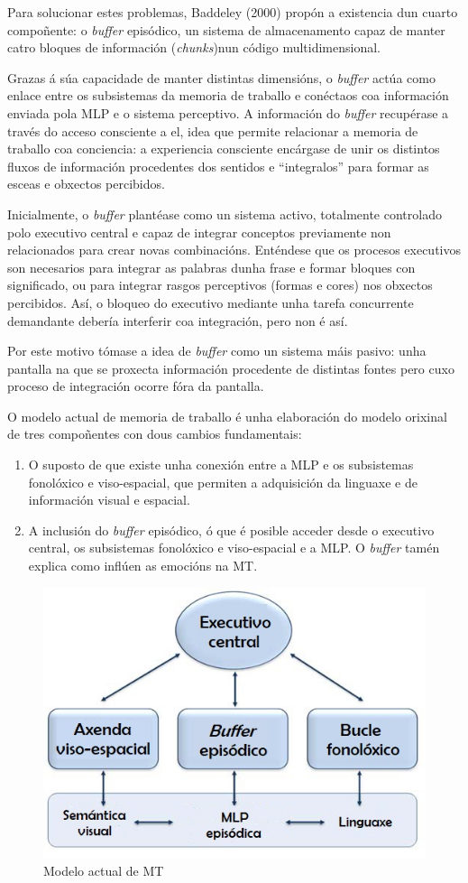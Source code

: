 \documentclass[a4paper,11pt]{article}
\begin{document}
Para solucionar estes problemas, Baddeley (2000) propón a existencia dun cuarto compoñente: o \textit{buffer} episódico, un sistema de almacenamento capaz de manter catro bloques de información (\textit{chunks})nun código multidimensional. 

Grazas á súa capacidade de manter distintas dimensións, o \textit{buffer} actúa como enlace entre os subsistemas da memoria de traballo e conéctaos coa información enviada pola MLP e o sistema perceptivo. A información do \textit{buffer} recupérase a través do acceso consciente a el, idea que permite relacionar a memoria de traballo coa conciencia: a experiencia consciente encárgase de unir os distintos fluxos de información procedentes dos sentidos e ``integralos'' para formar as esceas e obxectos percibidos. 

Inicialmente, o \textit{buffer} plantéase como un sistema activo, totalmente controlado polo executivo central e capaz de integrar conceptos previamente non relacionados para crear novas combinacións. Enténdese que os procesos executivos son necesarios para integrar as palabras dunha frase e formar bloques con significado, ou para integrar rasgos perceptivos (formas e cores) nos obxectos percibidos. Así, o bloqueo do executivo mediante unha tarefa concurrente demandante debería interferir coa integración, pero non é así. 

Por este motivo tómase a idea de \textit{buffer} como un sistema máis pasivo: unha pantalla na que se proxecta información procedente de distintas fontes pero cuxo proceso de integración ocorre fóra da pantalla.

O modelo actual de memoria de traballo é unha elaboración do modelo orixinal de tres compoñentes con dous cambios fundamentais:
\begin{enumerate}
	\item O suposto de que existe unha conexión entre a MLP e os subsistemas fonolóxico e
	viso-espacial, que permiten a adquisición da linguaxe e de información visual e espacial.
	\item A inclusión do \textit{buffer} episódico, ó que é posible acceder desde o executivo
	central, os subsistemas fonolóxico e viso-espacial e a MLP. O \textit{buffer} tamén explica como
	inflúen as emocións na MT.
\end{enumerate}

\begin{figure}[h!]
	\centering
	\includegraphics[width=0.4\linewidth]{memoria2_5}
	\caption{Modelo actual de MT}
\end{figure}
\end{document}
